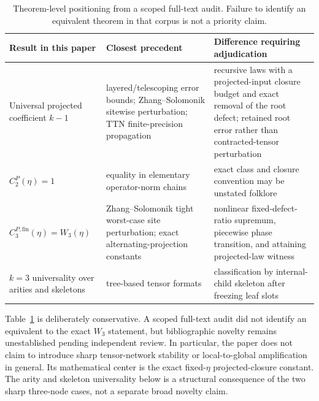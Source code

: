 \documentclass[11pt]{article}
\theoremstyle{definition}
\newcommand{\fin}{\mathrm{fin}}
\begin{document}
\begin{table}[H]
\centering
\small
\caption{Theorem-level positioning from a scoped full-text audit.  Failure to
identify an equivalent theorem in that corpus is not a priority claim.}
\label{tab:positioning}
\begin{tabular}{>{\raggedright\arraybackslash}p{}
                >{\raggedright\arraybackslash}p{}
                >{\raggedright\arraybackslash}p{}}
\toprule
Result in this paper & Closest precedent & Difference requiring adjudication\\
\midrule
Universal projected coefficient $k-1$ & layered/telescoping error bounds;
Zhang--Solomonik sitewise perturbation; TTN finite-precision propagation &
recursive laws with a projected-input closure budget and exact removal of the
root defect; retained root error rather than contracted-tensor perturbation\\
$C_2^P(\eta)=1$ & equality in elementary operator-norm chains & exact class and
closure convention may be unstated folklore\\
$C_3^{P,\fin}(\eta)=W_3(\eta)$ & Zhang--Solomonik tight worst-case site
perturbation; exact alternating-projection constants & nonlinear fixed-defect-
ratio supremum, piecewise phase transition, and attaining projected-law
witness\\
$k=3$ universality over arities and skeletons & tree-based tensor formats &
classification by internal-child skeleton after freezing leaf slots\\
\bottomrule
\end{tabular}
\end{table}

Table~\ref{tab:positioning} is deliberately conservative.  A scoped full-text
audit did not identify an equivalent to the exact $W_3$ statement, but
bibliographic novelty remains unestablished pending independent review.  In
particular, the paper does not claim to introduce sharp tensor-network
stability or local-to-global amplification in general.  Its mathematical
center is the exact fixed-$\eta$ projected-closure constant.  The arity and
skeleton universality below is a structural consequence of the two sharp
three-node cases, not a separate broad novelty claim.
\end{document}
